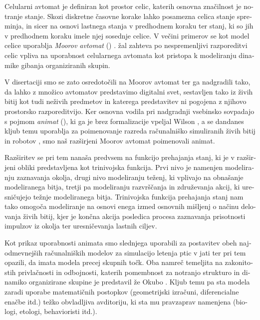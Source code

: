 \begin{slovenian}
Celularni avtomat je definiran kot prostor celic, katerih osnovna značilnost je notranje stanje. Skozi diskretne časovne korake lahko posamezna celica stanje spreminja, in sicer na osnovi lastnega stanja v predhodnem koraku ter stanj, ki so jih v predhodnem koraku imele njej sosednje celice. V večini primerov se kot model celice uporablja \emph{Moorov avtomat} () \cite{mraz:2000}. žal zahteva po nespremenljivi razporeditvi celic vpliva na uporabnost celularnega avtomata kot pristopa k modeliranju dinamike gibanja organiziranih skupin. 

V disertaciji smo se zato osredotočili na Moorov avtomat ter ga nadgradili tako, da lahko z množico avtomatov predstavimo digitalni svet, sestavljen tako iz živih bitij kot tudi neživih predmetov in katerega predstavitev ni pogojena z njihovo prostorsko razporeditvijo. Ker osnovna vodila pri nadgradnji vsebinsko sovpadajo s pojmom \emph{animat} (), ki ga je brez formalizacije vpeljal Wilson \cite{wilson:1985}, a se dandanes kljub temu uporablja za poimenovanje razreda računalniško simuliranih živih bitij in robotov \cite{cliff:1993,watts:1998}, smo naš razširjeni Moorov avtomat poimenovali animat. 

Razširitev se pri tem nanaša predvsem na funkcijo prehajanja stanj, ki je v razširjeni obliki predstavljena kot trinivojska funkcija. Prvi nivo je namenjen modeliranju zaznavanja okolja, drugi nivo modeliranju teženj, ki vplivajo na obnašanje modeliranega bitja, tretji pa modeliranju razvrščanja in združevanja akcij, ki uresničujejo težnje modeliranega bitja. Trinivojska funkcija prehajanja stanj nam tako omogoča modeliranje na osnovi enega izmed osnovnih mišljenj o načinu delovanja živih bitij, kjer je končna akcija posledica procesa zaznavanja prisotnosti impulzov iz okolja ter uresničevanja lastnih ciljev.

Kot prikaz uporabnosti animata smo slednjega uporabili za postavitev obeh najodmevnejših računalniških modelov za simulacijo letenja ptic v jati ter pri tem opazili, da imata modela precej skupnih točk. Oba namreč temeljita na zakonitostih privlačnosti in odbojnosti, katerih pomembnost za notranjo strukturo in dinamiko organizirane skupine je predstavil že Okubo \cite{okubo:1980}. Kljub temu pa sta modela zaradi uporabe matematičnih postopkov (geometrijski izračuni, diferencialne enačbe itd.) težko obvladljiva avditoriju, ki sta mu pravzaprav namenjena (biologi, etologi, behavioristi itd.).


\end{slovenian}
